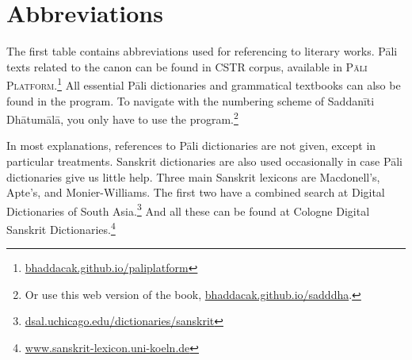 \clearpage
{}
{}
\setcounter{footnote}{0}
\chapter*{Abbreviations}\label{chap:abbrev}

The first table contains abbreviations used for referencing to literary works. Pāli texts related to the canon can be found in CSTR corpus, available in \textsc{Pāli\,Platform}.\footnote{\url{bhaddacak.github.io/paliplatform}} All essential Pāli dictionaries and grammatical textbooks can also be found in the program. To navigate with the numbering scheme of Saddanīti Dhātumālā, you only have to use the program.\footnote{Or use this web version of the book, \url{bhaddacak.github.io/sadddha}.}

In most explanations, references to Pāli dictionaries are not given, except in particular treatments. Sanskrit dictionaries are also used occasionally in case Pāli dictionaries give us little help. Three main Sanskrit lexicons are Macdonell's, Apte's, and Monier-Williams. The first two have a combined search at Digital Dictionaries of South Asia.\footnote{\url{dsal.uchicago.edu/dictionaries/sanskrit}} And all these can be found at Cologne Digital Sanskrit Dictionaries.\footnote{\url{www.sanskrit-lexicon.uni-koeln.de}}


